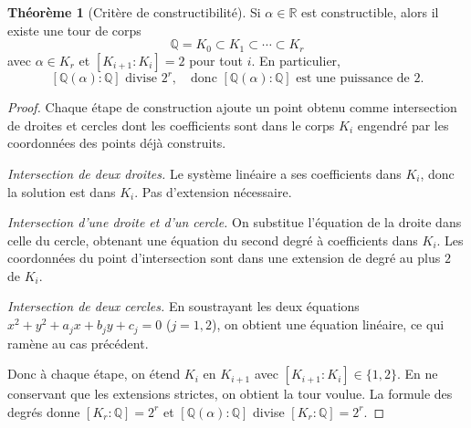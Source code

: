 \documentclass[12pt,a4paper,openany]{book}
\theoremstyle{definition}
\newtheorem{theoreme}{Théorème}[chapter]
\newcommand{\Q}{\mathbb{Q}}
\newcommand{\R}{\mathbb{R}}
\begin{document}
\begin{center}
\end{center}

\begin{theoreme}[Critère de constructibilité]\label{thm:critere-constructibilite}
Si $\alpha \in \R$ est constructible, alors il existe une tour de corps
\[
  \Q = K_0 \subset K_1 \subset \cdots \subset K_r
\]
avec $\alpha \in K_r$ et $[K_{i+1}:K_i] = 2$ pour tout $i$. En particulier,
\[
  [\Q(\alpha):\Q] \text{ divise } 2^r, \quad\text{donc }
  [\Q(\alpha):\Q] \text{ est une puissance de } 2.
\]
\end{theoreme}

\begin{proof}
Chaque étape de construction ajoute un point obtenu comme intersection de
droites et cercles dont les coefficients sont dans le corps $K_i$ engendré
par les coordonnées des points déjà construits.

\emph{Intersection de deux droites.} Le système linéaire a ses coefficients
dans $K_i$, donc la solution est dans $K_i$. Pas d'extension nécessaire.

\emph{Intersection d'une droite et d'un cercle.} On substitue l'équation
de la droite dans celle du cercle, obtenant une équation du second degré à
coefficients dans $K_i$. Les coordonnées du point d'intersection sont dans
une extension de degré au plus $2$ de $K_i$.

\emph{Intersection de deux cercles.} En soustrayant les deux équations
$x^2 + y^2 + a_j x + b_j y + c_j = 0$ ($j = 1, 2$), on obtient une
équation linéaire, ce qui ramène au cas précédent.

Donc à chaque étape, on étend $K_i$ en $K_{i+1}$ avec
$[K_{i+1}:K_i] \in \{1, 2\}$. En ne conservant que les extensions
strictes, on obtient la tour voulue. La formule des degrés donne
$[K_r:\Q] = 2^r$ et $[\Q(\alpha):\Q]$ divise $[K_r:\Q] = 2^r$.
\end{proof}
\end{document}

